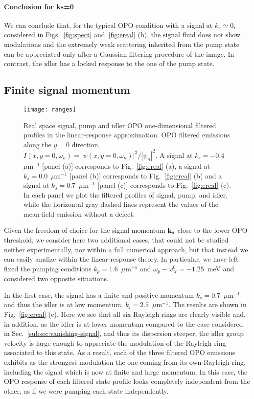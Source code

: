 \paragraph{Conclusion for ks=0}
We can conclude that, for the typical OPO condition with a signal at
$k_s \simeq 0$, considered in Figs.~\ref{fig:spect}
and~\ref{fig:ereal} (b), the signal fluid does not show modulations
and the extremely weak scattering inherited from the pump state can be
appreciated only after a Gaussian filtering procedure of the image. In
contrast, the idler has a locked response to the one of the pump
state.

\subsection{Finite signal momentum}
\label{subsec:finite-signal}
%
\begin{figure}[tb]\centering
\texttt{[image: ranges]}
\caption{Real space signal, pump and idler OPO one-dimensional
  filtered profiles in the linear-response approximation. OPO filtered
  emissions along the $y=0$ direction, $I (x, y=0, \omega_n) =
  |\psi(x,y=0, \omega_n)|^2/|\psi_n|^2$.  A signal at $k_s =
  -0.4$~$\mu$m$^{-1}$ [panel (a)] corresponds to Fig.~\ref{fig:ereal}
  (a), a signal at $k_s = 0.0$~$\mu$m$^{-1}$ [panel (b)] corresponds to
  Fig.~\ref{fig:ereal} (b) and a signal at $k_s = 0.7$~$\mu$m$^{-1}$
  [panel (c)] corresponds to Fig.~\ref{fig:ereal} (c). In each panel we
  plot the filtered profiles of signal, pump, and idler, while the
  horizontal gray dashed lines represent the values of the mean-field
  emission without a defect.}
\label{fig:range}
\end{figure}
%
Given the freedom of choice for the signal momentum $\mathbf{k}_s$ close
to the lower OPO threshold, we consider here two additional cases,
that could not be studied neither experimentally, nor within a full
numerical approach, but that instead we can easily analize within the
linear-response theory.
%
In particular, we have left fixed the pumping conditions
$k_p=1.6$~$\mu$m$^{-1}$ and $\omega_p-\omega_X^0=-1.25$~meV and
considered two opposite situations.

In the first case, the signal has a finite and positive momentum
$k_s = 0.7$~$\mu$m$^{-1}$ and thus the idler is at low momentum,
$k_i =2.5$~$\mu$m$^{-1}$. The results are shown in
Fig.~\ref{fig:ereal} (c).
%
Here we see that all six Rayleigh rings are clearly visible and, in
addition, as the idler is at lower momentum compared to the case
considered in Sec.~\ref{subsec:vanishing-signal}, and thus its
dispersion steeper, the idler group velocity is large enough to
appreciate the modulation of the Rayleigh ring associated to this
state. As a result, each of the three filtered OPO emissions exhibits
as the strongest modulation the one coming from its own Rayleigh ring,
including the signal which is now at finite and large momentum. In
this case, the OPO response of each filtered state profile looks
completely independent from the other, as if we were pumping each
state independently.

